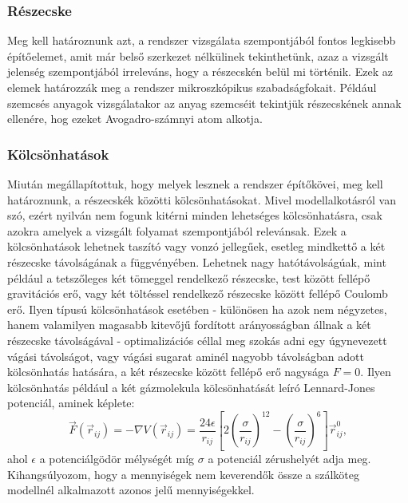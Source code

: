 \subsubsection*{Részecske} 
Meg kell határoznunk azt, a rendszer vizsgálata szempontjából fontos legkisebb építőelemet, amit már belső szerkezet nélkülinek tekinthetünk, azaz a vizsgált jelenség szempontjából irreleváns, hogy a részecskén belül mi történik. Ezek az elemek határozzák meg a rendszer mikroszkópikus szabadságfokait. Például szemcsés anyagok vizsgálatakor az anyag szemcséit tekintjük részecskének annak ellenére, hog ezeket Avogadro-számnyi atom alkotja.
\subsubsection*{Kölcsönhatások} 
Miután megállapítottuk, hogy melyek lesznek a rendszer építőkövei, meg kell határoznunk, a részecskék közötti kölcsönhatásokat. Mivel modellalkotásról van szó, ezért nyilván nem fogunk kitérni minden lehetséges kölcsönhatásra, csak azokra amelyek a vizsgált folyamat szempontjából relevánsak. Ezek a kölcsönhatások lehetnek taszító vagy vonzó jellegűek, esetleg mindkettő a két részecske távolságának a függvényében. Lehetnek nagy hatótávolságúak, mint például a tetszőleges két tömeggel rendelkező részecske, test között fellépő gravitációs erő, vagy két töltéssel rendelkező részecske között fellépő Coulomb erő. Ilyen típusú kölcsönhatások esetében - különösen ha azok nem négyzetes, hanem valamilyen magasabb kitevőjű fordított arányosságban állnak a két részecske távolságával - optimalizációs céllal meg szokás adni egy úgynevezett vágási távolságot, vagy vágási sugarat aminél nagyobb távolságban adott kölcsönhatás hatására, a két részecske között fellépő erő nagysága $F=0$. Ilyen kölcsönhatás például a két gázmolekula kölcsönhatását leíró Lennard-Jones potenciál, aminek képlete:
\begin{equation}
\displaystyle
\vec{F}(\vec{r}_{ij})=-\nabla V(\vec{r}_{ij})=\frac{24\epsilon}{r_{ij}}\left[2\left(\frac{\sigma}{r_{ij}}\right)^{12}-\left(\frac{\sigma}{r_{ij}}\right)^{6}\right]\vec{r}_{ij}^{0},
\end{equation} 
ahol $\epsilon$ a potenciálgödör mélységét míg $\sigma$ a potenciál zérushelyét adja meg. Kihangsúlyozom, hogy a mennyiségek nem keverendők össze a szálköteg modellnél alkalmazott azonos jelű mennyiségekkel. 

